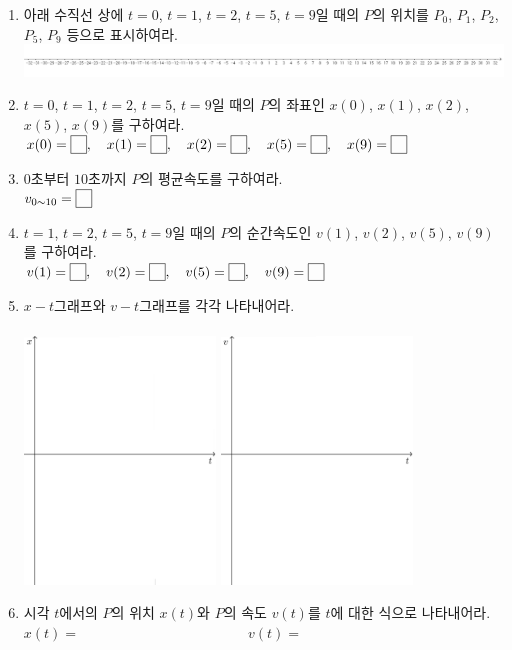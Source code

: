 \documentclass{oblivoir}
\newcounter{num}
\newcommand\pb[1]{\ensuremath{\fbox{\phantom{#1}}}}
\begin{document}
\begin{enumerate}[label=(\(\arabic*\))]
\item
아래 수직선 상에 \(t=0\), \(t=1\), \(t=2\), \(t=5\), \(t=9\)일 때의 \(P\)의 위치를 \(P_0\), \(P_1\), \(P_2\), \(P_5\), \(P_9\) 등으로 표시하여라.\\
\includegraphics[width=1.3\textwidth]{line2}
\item
\(t=0\), \(t=1\), \(t=2\), \(t=5\), \(t=9\)일 때의 \(P\)의 좌표인 \(x(0)\), \(x(1)\), \(x(2)\), \(x(5)\), \(x(9)\)를 구하여라.\\
\(x(0)=\pb{1},\quad x(1)=\pb{1},\quad x(2)=\pb{1},\quad x(5)=\pb{1},\quad x(9)=\pb{1}\)
\item
\(0\)초부터 \(10\)초까지 \(P\)의 평균속도를 구하여라.\\
\(v_{0\sim10}=\pb{1}\)
\item
\(t=1\), \(t=2\), \(t=5\), \(t=9\)일 때의 \(P\)의 순간속도인 \(v(1)\), \(v(2)\), \(v(5)\), \(v(9)\)를 구하여라.\\
\(v(1)=\pb{1},\quad v(2)=\pb{1},\quad v(5)=\pb{1},\quad v(9)=\pb{1}\)
\item
\(x-t\)그래프와 \(v-t\)그래프를 각각 나타내어라.\\\\
\includegraphics[width=0.4\textwidth]{xt}\qquad\qquad
\includegraphics[width=0.4\textwidth]{vt}
\item
시각 \(t\)에서의 \(P\)의 위치 \(x(t)\)와 \(P\)의 속도 \(v(t)\)를 \(t\)에 대한 식으로 나타내어라.\\
\(x(t)=\qquad\qquad\qquad\qquad\qquad\qquad
v(t)=\)
\end{enumerate}
\end{document}
